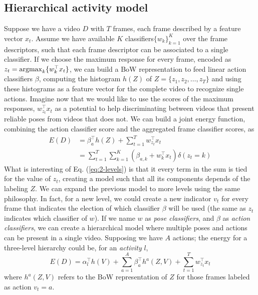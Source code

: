 \subsection{Hierarchical activity model}

Suppose we have a video $D$ with $T$ frames, each frame described by a feature vector $x_t$. Assume we have available $K$ classifiers$\{w_k\}_{k=1}^K$ over the frame descriptors, such that each frame descriptor can be associated to a single classifier. If we choose the maximum response for every frame, encoded as $z_t = \operatorname*{argmax}_k\{w_k^\top x_t\}$,  we can build a BoW representation to feed linear action classifiers $\beta$, computing the histogram $h(Z)$ of $Z = \{z_1,z_2,\dots,z_T\}$ and using these histograms as a feature vector for the complete video to recognize single actions. Imagine now that we would like to use the scores of the maximum responses, $w_{z_t}^\top x_t$ as a potential to help discriminating between videos that present reliable poses from videos that does not. We can build a joint energy function, combining the action classifier score and the aggregated frame classifier scores, as
\begin{equation}
\label{eq:2-levels}
\begin{split}
E(D) &= \beta_{a}^\top h(Z) + \sum_{t=1}^T w_{z_t}^\top x_t \\ & = \sum_{t=1}^T\sum_{k=1}^K\left(\beta_{a,k} + w_k^\top x_t \right)\delta(z_t=k)
\end{split}
\end{equation}
What is interesting of Eq. (\ref{eq:2-levels}) is that it every term in the sum is tied for the value of $z_t$, creating a model such that all its components depends of the labeling $Z$. We can expand the previous model to more levels using the same philosophy. In fact, for a new level, we could create a new indicator $v_t$ for every frame that indicates the election of which classifier $\beta$ will be used (the same as $z_t$ indicates which classifier of $w$). If we name $w$ as \emph{pose classifiers}, and $\beta$ as \emph{action classifiers}, we can create a hierarchical model where multiple poses and actions can be present in a single video. Supposing we have $A$ actions; the energy for a three-level hierarchy could be, for an \emph{activity} $l$,
\begin{equation}
E(D) =\alpha_l^\top h(V) + \sum_{a=1}^A \beta_{a}^\top h^a(Z,V) + \sum_{t=1}^T w_{z_t}^\top x_t 
\end{equation}
where $h^a(Z,V)$ refers to the BoW representation of $Z$ for those frames labeled as action $v_t = a$.

